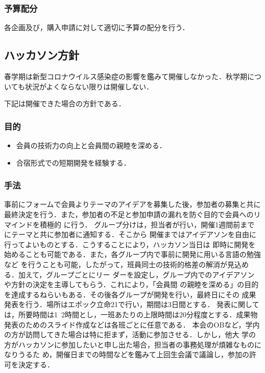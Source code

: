 \subsubsection*{予算配分}
各企画及び，購入申請に対して適切に予算の配分を行う．


\subsection*{ハッカソン方針}
春学期は新型コロナウイルス感染症の影響を鑑みて開催しなかった．秋学期についても状況がよくならない限りは開催しない．

下記は開催できた場合の方針である．

\subsubsection*{目的}
\begin{itemize}
    \item 会員の技術力の向上と会員間の親睦を深める．
    \item 合宿形式での短期開発を経験する．
\end{itemize}

\subsubsection*{手法}
事前にフォームで会員よりテーマのアイデアを募集した後，参加者の募集と共に最終決定を行う．また，参加者の不足と参加申請の漏れを防ぐ目的で会員へのリマインドを積極的
に行う．
グループ分けは，担当者が行い，開催1週間前までにテーマと共に参加者に通知する．そこから
開催まではアイデアソンを自由に行ってよいものとする．こうすることにより，ハッカソン当日は
即時に開発を始めることも可能である．また，各グループ内で事前に開発に用いる言語の勉強など
を行うことも可能，したがって，班員同士の技術的格差の解消が見込める．加えて，グループごとにリー
ダーを設定し，グループ内でのアイデアソンや方針の決定を主導してもらう．これにより，「会員間
の親睦を深める」の目的を達成するねらいもある．その後各グループが開発を行い，最終日にその
成果発表を行う．場所はエポック立命21で行い，期間は3日間とする．
発表に関しては，所要時間は1~2時間とし，一班あたりの上限時間は20分程度とする．成果物
発表のためのスライド作成などは各班ごとに任意である．
本会のOBなど，学内の方が訪問してきた場合は特に拒まず，活動に参加させる．しかし，他大
学の方がハッカソンに参加したいと申し出た場合，担当者の事務処理が煩雑なものになりうるた
め，開催日までの時間などを鑑みて上回生会議で議論し，参加の許可を決定する．




